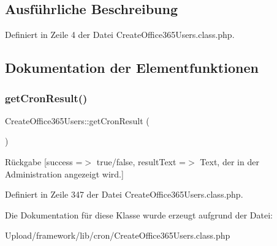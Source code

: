 \subsection{Ausführliche Beschreibung}


Definiert in Zeile 4 der Datei Create\+Office365\+Users.\+class.\+php.



\subsection{Dokumentation der Elementfunktionen}
\mbox{\label{class_create_office365_users_a53a7312344d7edc069ac45193cc20eb0}} 
\subsubsection{\texorpdfstring{get\+Cron\+Result()}{getCronResult()}}
{\footnotesize\ttfamily Create\+Office365\+Users\+::get\+Cron\+Result (\begin{DoxyParamCaption}{ }\end{DoxyParamCaption})}

\begin{DoxyReturn}{Rückgabe}
\mbox{[}\textquotesingle{}success\textquotesingle{} =$>$ \textquotesingle{}true/false\textquotesingle{}, \textquotesingle{}result\+Text\textquotesingle{} =$>$ \textquotesingle{}Text, der in der Administration angezeigt wird.\textquotesingle{}\mbox{]} 
\end{DoxyReturn}


Definiert in Zeile 347 der Datei Create\+Office365\+Users.\+class.\+php.



Die Dokumentation für diese Klasse wurde erzeugt aufgrund der Datei\+:\begin{DoxyCompactItemize}
\item 
Upload/framework/lib/cron/Create\+Office365\+Users.\+class.\+php\end{DoxyCompactItemize}

